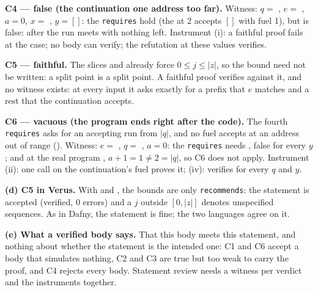 \documentclass[11pt]{article}
\begin{document}
\begin{answer}
\textbf{C4 --- false (the continuation one address too far).} Witness: $q =$
, $e =$ , $a = 0$, $x =$
\dfy{['a']}, $y = []$: the \texttt{requires} hold (the  at 2
accepts $[]$ with fuel 1), but  is false: after
 the run meets  with nothing left. Instrument (i): a
faithful proof fails at the  case; no body can verify; the refutation
at these values verifies.

\textbf{C5 --- faithful.} The slices  and  already
force $0 \le j \le |z|$, so the bound need not be written: a split point is a
split point. A faithful proof verifies against it, and no witness exists: at
every input it asks exactly for a prefix that $e$ matches and a rest that the
continuation accepts.

\textbf{C6 --- vacuous (the program ends right after the code).} The fourth
\texttt{requires} asks for an accepting run from $|q|$, and no fuel accepts at
an address out of range (). Witness: $e =$ ,
$q =$ \dfy{[IChar('a')]}, $a = 0$: the \texttt{requires} needs
, false for every $y$; and at the real program
, $a + 1 = 1 \neq 2 = |q|$, so C6 does not apply.
Instrument (ii): one  call on the continuation's fuel proves
it; (iv):  verifies for every $q$ and $y$.

\textbf{(d) C5 in Verus.} With  and
, the bounds are only \texttt{recommends}:
the statement is accepted (verified, 0 errors) and a $j$ outside $[0, |z|]$
denotes unspecified sequences. As in Dafny, the statement is
fine; the two languages agree on it.

\textbf{(e) What a verified body says.} That this body meets this statement,
and nothing about whether the statement is the intended one: C1 and C6 accept a
body that simulates nothing, C2 and C3 are true but too weak to carry the
proof, and C4 rejects every body.
Statement review needs a witness per verdict and the instruments together.
\end{answer}
\end{document}
